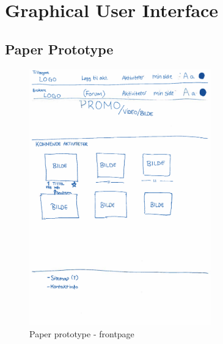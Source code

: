\chapter{Graphical User Interface}

\section{Paper Prototype}
\label{paper_prototype}

\begin{figure}[H]
\centering
     \includegraphics[width=0.7\textwidth]{fig/PaperPrototype/Front_page.pdf}
\caption{Paper prototype - frontpage}
\label{paper_front}
\end{figure}


